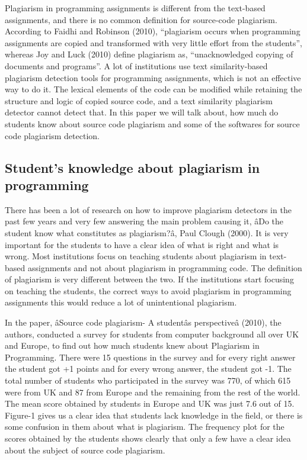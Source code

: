 \documentclass[a4paper]{article}
\begin{document}
Plagiarism in programming assignments is different from the text-based
assignments, and there is no common definition for source-code
plagiarism. According to Faidhi and Robinson (2010), ``plagiarism occurs
when programming assignments are copied and transformed with very little
effort from the students'', whereas Joy and Luck (2010) define
plagiarism as, ``unacknowledged copying of documents and programs''. A
lot of institutions use text similarity-based plagiarism detection tools
for programming assignments, which is not an effective way to do it. The
lexical elements of the code can be modified while retaining the
structure and logic of copied source code, and a text similarity
plagiarism detector cannot detect that. In this paper we will talk
about, how much do students know about source code plagiarism and some
of the softwares for source code plagiarism detection.

\subsection{Student's knowledge about plagiarism in
programming}\label{students-knowledge-about-plagiarism-in-programming}

There has been a lot of research on how to improve plagiarism detectors
in the past few years and very few answering the main problem causing
it, âDo the student know what constitutes as plagiarism?â, Paul
Clough (2000). It is very important for the students to have a clear
idea of what is right and what is wrong. Most institutions focus on
teaching students about plagiarism in text-based assignments and not
about plagiarism in programming code. The definition of plagiarism is
very different between the two. If the institutions start focusing on
teaching the students, the correct ways to avoid plagiarism in
programming assignments this would reduce a lot of unintentional
plagiarism.

In the paper, âSource code plagiarism- A studentâs perspectiveâ
(2010), the authors, conducted a survey for students from computer
background all over UK and Europe, to find out how much students knew
about Plagiarism in Programming. There were 15 questions in the survey
and for every right answer the student got +1 points and for every wrong
answer, the student got -1. The total number of students who
participated in the survey was 770, of which 615 were from UK and 87
from Europe and the remaining from the rest of the world. The mean score
obtained by students in Europe and UK was just 7.6 out of 15. Figure-1
gives us a clear idea that students lack knowledge in the field, or
there is some confusion in them about what is plagiarism. The frequency
plot for the scores obtained by the students shows clearly that only a
few have a clear idea about the subject of source code plagiarism.
\end{document}
